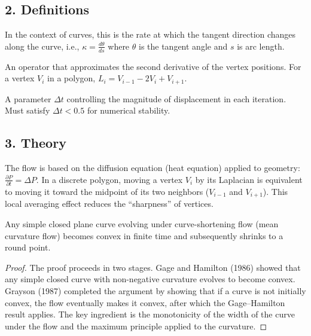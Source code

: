 \subsection{2. Definitions}

\begin{definition}\label{def:mean_curvature_curve}
In the context of curves, this is the rate at which the tangent direction changes along the curve, i.e., $\kappa = \frac{d\theta}{ds}$ where $\theta$ is the tangent angle and $s$ is arc length.
\end{definition}

\begin{definition}\label{def:discrete_laplacian}
An operator that approximates the second derivative of the vertex positions. For a vertex $V_i$ in a polygon, $L_i = V_{i-1} - 2V_i + V_{i+1}$.
\end{definition}

\begin{definition}\label{def:time_step_mcf}
A parameter $\Delta t$ controlling the magnitude of displacement in each iteration. Must satisfy $\Delta t < 0.5$ for numerical stability.
\end{definition}

\subsection{3. Theory}

The flow is based on the diffusion equation (heat equation) applied to geometry: $\frac{\partial P}{\partial t} = \Delta P$. In a discrete polygon, moving a vertex $V_i$ by its Laplacian is equivalent to moving it toward the midpoint of its two neighbors ($V_{i-1}$ and $V_{i+1}$). This local averaging effect reduces the ``sharpness'' of vertices.

\begin{theorem}\label{thm:gage_hamilton_grayson}
Any simple closed plane curve evolving under curve-shortening flow (mean curvature flow) becomes convex in finite time and subsequently shrinks to a round point.
\end{theorem}

\begin{proof}
The proof proceeds in two stages. Gage and Hamilton (1986)\cite{gage1986} showed that any simple closed curve with non-negative curvature evolves to become convex. Grayson (1987)\cite{grayson1987} completed the argument by showing that if a curve is not initially convex, the flow eventually makes it convex, after which the Gage--Hamilton result applies. The key ingredient is the monotonicity of the width of the curve under the flow and the maximum principle applied to the curvature.
\end{proof}

